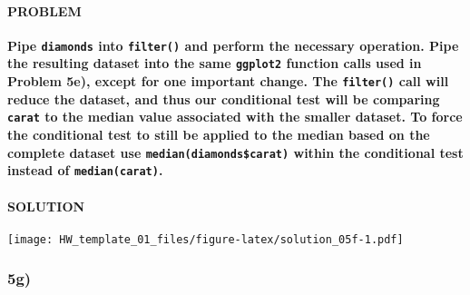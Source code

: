\documentclass[]{article}
\newenvironment{Shaded}{\begin{snugshade}}{\end{snugshade}}
\newcommand{\DataTypeTok}[1]{\textcolor[rgb]{0.13,0.29,0.53}{#1}}
\newcommand{\KeywordTok}[1]{\textcolor[rgb]{0.13,0.29,0.53}{\textbf{#1}}}
\newcommand{\NormalTok}[1]{#1}
\newcommand{\OperatorTok}[1]{\textcolor[rgb]{0.81,0.36,0.00}{\textbf{#1}}}
\newcommand{\StringTok}[1]{\textcolor[rgb]{0.31,0.60,0.02}{#1}}
\let\oldparagraph\paragraph
\renewcommand{\paragraph}[1]{\oldparagraph{#1}\mbox{}}
\begin{document}
\hypertarget{problem-29}{%
\paragraph{PROBLEM}\label{problem-29}}

\textbf{Pipe \texttt{diamonds} into \texttt{filter()} and perform the
necessary operation. Pipe the resulting dataset into the same
\texttt{ggplot2} function calls used in Problem 5e), except for one
important change. The \texttt{filter()} call will reduce the dataset,
and thus our conditional test will be comparing \texttt{carat} to the
median value associated with the smaller dataset. To force the
conditional test to still be applied to the median based on the complete
dataset use \texttt{median(diamonds\$carat)} within the conditional test
instead of \texttt{median(carat)}.}

\hypertarget{solution-28}{%
\paragraph{SOLUTION}\label{solution-28}}

\begin{Shaded}
\end{Shaded}

\texttt{[image: HW\_template\_01\_files/figure-latex/solution\_05f-1.pdf]}

\hypertarget{g-1}{%
\subsubsection{5g)}\label{g-1}}
\end{document}
